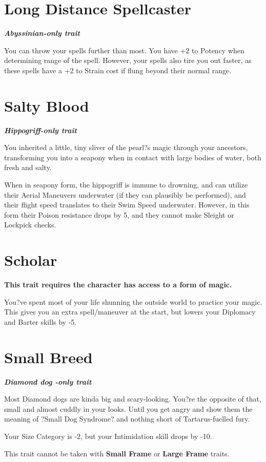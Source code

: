 \documentclass[11pt,a4paper,twocolumn]{book}
\begin{document}
	\section*{Long Distance Spellcaster}
	\emph{\textbf{Abyssinian-only trait}}
	
	You can throw your spells further than most. You have +2 to Potency when determining range of the spell. However, your spells also tire you out faster, as these spells have a +2 to Strain cost if flung beyond their normal range.
	
	\section*{Salty Blood}
	\emph{\textbf{Hippogriff-only trait}}
	
	You inherited a little, tiny sliver of the pearl?s magic through your ancestors, transforming you into a seapony when in contact with large bodies of water, both fresh and salty.
	
	When in seapony form, the hippogriff is immune to drowning, and can utilize their Aerial Maneuvers underwater (if they can plausibly be performed), and their flight speed translates to their Swim Speed underwater.
	However, in this form their Poison resistance drops by 5, and they cannot make Sleight or Lockpick checks.
	
	\section*{Scholar}
	\textbf{This trait requires the character has access to a form of magic.}
	
	You?ve spent most of your life shunning the outside world to practice your magic. This gives you an extra spell/maneuver at the start, but lowers your Diplomacy and Barter skills by -5.
	
	\section*{Small Breed}
	\emph{\textbf{Diamond dog -only trait}}
	
	Most Diamond dogs are kinda big and scary-looking. You?re the opposite of that, small and almost cuddly in your looks. Until you get angry and show them the meaning of ?Small Dog Syndrome? and nothing short of Tartarus-fuelled fury.
	
	Your Size Category is -2, but your Intimidation skill drops by -10. 
	
	This trait cannot be taken with \textbf{Small Frame} or \textbf{Large Frame} traits.
	
\end{document}
